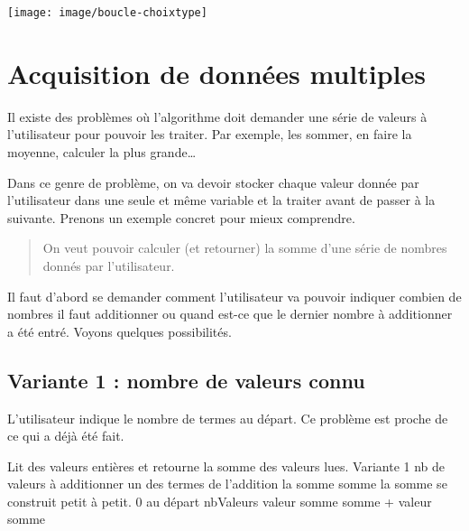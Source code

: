 	\begin{center}
		\bigskip
		\texttt{[image: image/boucle-choixtype]}
				\label{fig:boucle-choix}
	\end{center}

	
\section{Acquisition de données multiples}

	Il existe des problèmes
	où l'algorithme doit demander une série de valeurs
	à l'utilisateur pour pouvoir les traiter.
	Par exemple, les sommer, en faire la moyenne,
	calculer la plus grande\dots
	
	Dans ce genre de problème,
	on va devoir stocker chaque valeur donnée par l'utilisateur 
	dans une seule et même variable et la traiter avant de passer
	à la suivante.
	Prenons un exemple concret pour mieux comprendre.

	\begin{quote}
	On veut pouvoir calculer (et retourner)
	la somme d’une série de nombres donnés par l’utilisateur. 
	\end{quote}

	Il faut d’abord se demander 
	comment l’utilisateur va pouvoir indiquer
	combien de nombres il faut additionner 
	ou quand est-ce que le dernier nombre à additionner a été entré. 
	Voyons quelques possibilités.
	
	\clearpage
	\subsection{Variante 1 : nombre de valeurs connu} 
	
		L’utilisateur indique le nombre de termes au départ.
		Ce problème est proche de ce qui a déjà été fait.
		
		\begin{LDA}
		\LComment Lit des valeurs entières et retourne la somme des valeurs lues.
		 \RComment Variante 1
			 \RComment nb de valeurs à additionner
			 \RComment un des termes de l’addition
			 \RComment la somme
			\Let somme  \RComment la somme se construit petit à petit. 0 au départ
			\Read nbValeurs
				\Read valeur
				\Let somme \Gets somme + valeur 
			\EndFor
			\Return somme
		\EndAlgo
		\end{LDA}

